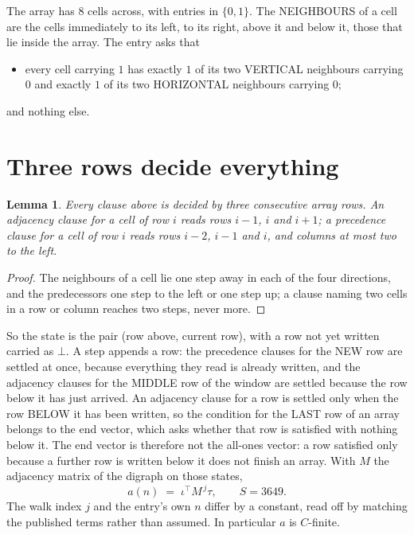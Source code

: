 \documentclass[11pt,a4paper]{article}
\theoremstyle{plain}
\newtheorem{lemma}[theorem]{Lemma}
\theoremstyle{definition}
\begin{document}
The array has $8$ cells across, with entries in $\{0,1\}$. The NEIGHBOURS of a cell are the
cells immediately to its left, to its right, above it and below it, those that lie inside the
array. The entry asks that
\begin{itemize}
\item every cell carrying $1$ has exactly $1$ of its two VERTICAL neighbours carrying $0$ and exactly $1$ of its two HORIZONTAL neighbours carrying $0$;
\end{itemize}
and nothing else.

\section{Three rows decide everything}

\begin{lemma}\label{lem:win}
Every clause above is decided by three consecutive array rows. An adjacency clause for a cell
of row $i$ reads rows $i-1$, $i$ and $i+1$; a precedence clause for a cell of row $i$ reads
rows $i-2$, $i-1$ and $i$, and columns at most two to the left.
\end{lemma}

\begin{proof}
The neighbours of a cell lie one step away in each of the four directions, and the predecessors
one step to the left or one step up; a clause naming two cells in a row or column reaches two
steps, never more.
\end{proof}

So the state is the pair (row above, current row), with a row not yet written carried as
$\bot$. A step appends a row: the precedence clauses for the NEW row are settled at once,
because everything they read is already written, and the adjacency clauses for the MIDDLE row
of the window are settled because the row below it has just arrived. An adjacency clause for a row is settled only when the row BELOW it has been
written, so the condition for the LAST row of an array belongs to the end vector, which asks
whether that row is satisfied with nothing below it. The end vector is therefore not the
all-ones vector: a row satisfied only because a further row is written below it does not
finish an array. With $M$ the
adjacency matrix of the digraph on those states,
\[
a(n)\;=\;\iota^{\!\top}M^{\,j}\tau ,\qquad S=3649.
\]
The walk index $j$ and the entry's own $n$ differ by a constant, read off by matching the
published terms rather than assumed. In particular $a$ is $C$-finite.
\end{document}
